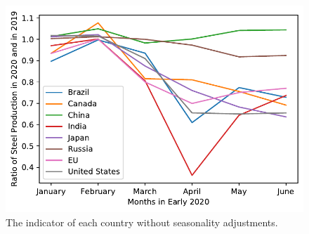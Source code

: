 \begin{figure}[h]
	\centering
	\includegraphics[width=0.7\linewidth]{../predictions/otherindustries_notadjusted.pdf}
	\caption{The indicator of each country without seasonality adjustments.}
	\label{fig:otherindustry_notadjusted}
\end{figure}
